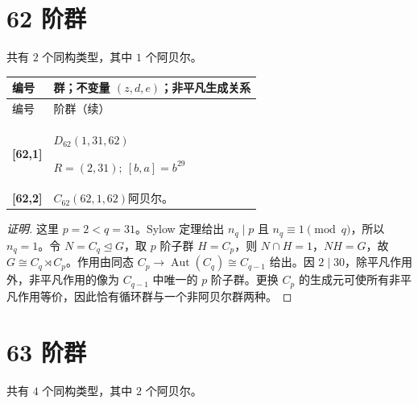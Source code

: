 \documentclass[UTF8,fontset=fandol,11pt,a4paper]{ctexart}
\newcommand{\Aut}{\operatorname{Aut}}\newcommand{\GL}{\operatorname{GL}}\newcommand{\ord}{\operatorname{ord}}\newcommand{\Z}{\mathrm Z}
\begin{document}
\section*{62 阶群}\label{order:62}

共有 $2$ 个同构类型，其中 $1$ 个阿贝尔。

\begingroup\small\setlength{\tabcolsep}{3pt}\renewcommand{\arraystretch}{1.12}

\begin{longtable}{@{}p{17mm}>{\raggedright\arraybackslash}p{141mm}@{}}

\toprule 编号 & 群；不变量 $(z,d,e)$；非平凡生成关系\\\midrule\endfirsthead

\toprule 编号 & 62 阶群（续）\\\midrule\endhead\bottomrule\endfoot

\textbf{[62,1]} & $D_{62}$\quad $(1,31,62)$\par\(R=(2,31);\allowbreak\ [b,a]=b^{29}\)\\[3pt]

\textbf{[62,2]} & $C_{62}$\quad $(62,1,62)$\quad 阿贝尔。\\[3pt]

\end{longtable}\endgroup

\begin{proof}[证明]
这里 $p=2<q=31$。Sylow 定理给出 $n_q\mid p$ 且 $n_q\equiv1\pmod q$，所以 $n_q=1$。令 $N=C_q\trianglelefteq G$，取 $p$ 阶子群 $H=C_p$，则 $N\cap H=1$，$NH=G$，故 $G\cong C_q\rtimes C_p$。作用由同态 $C_p\to\Aut(C_q)\cong C_{q-1}$ 给出。因 $2\mid 30$，除平凡作用外，非平凡作用的像为 $C_{q-1}$ 中唯一的 $p$ 阶子群。更换 $C_p$ 的生成元可使所有非平凡作用等价，因此恰有循环群与一个非阿贝尔群两种。
\end{proof}

\section*{63 阶群}\label{order:63}

共有 $4$ 个同构类型，其中 $2$ 个阿贝尔。

\begingroup\small\setlength{\tabcolsep}{3pt}\renewcommand{\arraystretch}{1.12}
\end{document}
